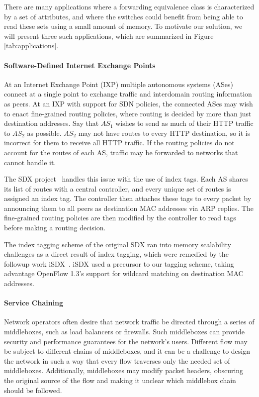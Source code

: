 There are many applications where a forwarding equivalence class is characterized by a set of attributes, and where the switches could benefit from being able to read these sets using a small amount of memory. To motivate our solution, we will present three such applications, which are summarized in Figure \ref{tab:applications}.
 
\paragraph{Software-Defined Internet Exchange Points}
At an Internet Exchange Point (IXP) multiple autonomous systems (ASes) connect at a single point to exchange traffic and interdomain routing information as peers.  At an IXP with support for SDN policies, the connected ASes may wish to enact fine-grained routing policies, where routing is decided by more than just destination addresses. Say that $AS_1$ wishes to send as much of their HTTP traffic to $AS_2$ as possible. $AS_2$ may not have routes to every HTTP destination, so it is incorrect for them to receive all HTTP traffic. If the routing policies do not account for the routes of each AS, traffic may be forwarded to networks that cannot handle it. 

The SDX project~\cite{sdx} handles this issue with the use of index tags. Each AS shares its list of routes with a central controller, and every unique set of routes is assigned an index tag. The controller then attaches these tags to every packet by announcing them to all peers as destination MAC addresses via ARP replies. The fine-grained routing policies are then modified by the controller to read tags before making a routing decision. 

The index tagging scheme of the original SDX ran into memory scalability challenges as a direct result of index tagging, which were remedied by the followup work iSDX~\cite{isdx}. iSDX used a precursor to our tagging scheme, taking advantage OpenFlow 1.3's support for wildcard matching on destination MAC addresses. 

\paragraph{Service Chaining}
Network operators often desire that network traffic be directed through a series of middleboxes, such as load balancers or firewalls. Such middleboxes can provide security and performance guarantees for the network's users.
 Different flow may be subject to different chains of middleboxes, and it can be a challenge to design the network in such a way that every flow traverses only the needed set of middleboxes. Additionally, middleboxes may modify packet headers, obscuring the original source of the flow and making it unclear which middlebox chain should be followed. 
 
